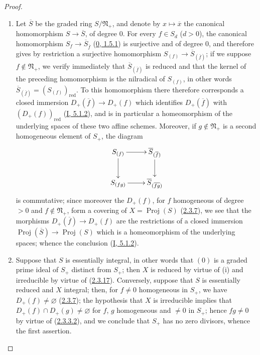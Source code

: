\begin{proof}
\begin{enumerate}
  \item[\rm(i)] Let $\overline{S}$ be the graded ring
    $S/\mathfrak{N}_+$, and denote by $x\mapsto\overline{x}$ the
    canonical homomorphism $S\to\overline{S}$, of degree $0$. For every
    $f\in S_d$ ($d>0$), the canonical homomorphism
    $S_f\to\overline{S}_{\overline{f}}$
    (\hyperref[0.1.5.1]{0, 1.5.1}) is surjective and of degree $0$, and
    therefore gives by restriction a surjective homomorphism
    $S_{(f)}\to\overline{S}_{(\overline{f})}$; if we suppose
    $f\notin\mathfrak{N}_+$, we verify immediately that
    $\overline{S}_{(\overline{f})}$ is reduced and that the kernel of
    the preceding homomorphism is the nilradical of $S_{(f)}$, in other
    words $\overline{S}_{(\overline{f})}=(S_{(f)})_{\mathrm{red}}$. To this
    homomorphism there therefore corresponds a closed immersion
    $D_+(\overline{f})\to D_+(f)$ which identifies $D_+(\overline{f})$ with
    $(D_+(f))_{\mathrm{red}}$ (\hyperref[I.5.1.2]{I, 5.1.2}), and is in
    particular a homeomorphism of the underlying spaces of these two
    affine schemes. Moreover, if $g\notin\mathfrak{N}_+$ is a second
    homogeneous element of $S_+$, the diagram
    \[
      \xymatrix{
        S_{(f)}\ar[r]\ar[d]
        & \overline{S}_{(\overline{f})}\ar[d]\\
        S_{(fg)}\ar[r]
        & \overline{S}_{(\overline{fg})}
      }
    \]
    is commutative; since moreover the $D_+(f)$, for $f$ homogeneous of
    degree $>0$ and $f\notin\mathfrak{N}_+$, form a covering of
    $X=\operatorname{Proj}(S)$ (\hyperref[II.2.3.7]{2.3.7}), we see
    that the morphisms $D_+(\overline{f})\to D_+(f)$ are the restrictions
    of a closed immersion
    $\operatorname{Proj}(\overline{S})\to\operatorname{Proj}(S)$ which is
    a homeomorphism of the underlying spaces; whence the conclusion
    (\hyperref[I.5.1.2]{I, 5.1.2}).
  \item[\rm(ii)] Suppose that $S$ is essentially integral, in other
    words that $(0)$ is a graded prime ideal of $S_+$ distinct from $S_+$;
    then $X$ is reduced by virtue of (i) and irreducible by virtue of
    (\hyperref[II.2.3.17]{2.3.17}). Conversely, suppose that $S$ is
    essentially reduced and $X$ integral; then, for $f\neq0$ homogeneous
    in $S_+$, we have $D_+(f)\neq\varnothing$
    (\hyperref[II.2.3.7]{2.3.7}); the hypothesis that $X$ is irreducible
    implies that $D_+(f)\cap D_+(g)\neq\varnothing$ for $f$, $g$
    homogeneous and $\neq0$ in $S_+$; hence $fg\neq0$ by virtue of
    (\hyperref[II.2.3.3.2]{2.3.3.2}), and we conclude that $S_+$ has no
    zero divisors, whence the first assertion.
\end{enumerate}
\end{proof}

